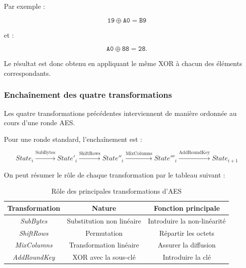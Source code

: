 \documentclass[12pt,a4paper]{article}
\begin{document}
Par exemple :

\[
\texttt{19}\oplus\texttt{A0}
=
\texttt{B9}
\]

et :

\[
\texttt{A0}\oplus\texttt{88}
=
\texttt{28}.
\]

Le résultat est donc obtenu en appliquant le même XOR à chacun
des éléments correspondants.



\subsubsection{Enchaînement des quatre transformations}

Les quatre transformations précédentes interviennent de manière
ordonnée au cours d'une ronde AES.

Pour une ronde standard, l'enchaînement est :

\[
\boxed{
State_i
\xrightarrow{\text{SubBytes}}
State'_i
\xrightarrow{\text{ShiftRows}}
State''_i
\xrightarrow{\text{MixColumns}}
State'''_i
\xrightarrow{\text{AddRoundKey}}
State_{i+1}
}
\]

On peut résumer le rôle de chaque transformation par le tableau
suivant :

\begin{table}[H]
\centering
\caption{Rôle des principales transformations d'AES}
\renewcommand{\arraystretch}{1.3}

\begin{tabular}{|c|c|c|}
\hline
\textbf{Transformation}
& \textbf{Nature}
& \textbf{Fonction principale}\\
\hline
\textit{SubBytes}
& Substitution non linéaire
& Introduire la non-linéarité\\
\hline
\textit{ShiftRows}
& Permutation
& Répartir les octets\\
\hline
\textit{MixColumns}
& Transformation linéaire
& Assurer la diffusion\\
\hline
\textit{AddRoundKey}
& XOR avec la sous-clé
& Introduire la clé\\
\hline
\end{tabular}
\end{table}


\end{document}
